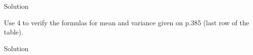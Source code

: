 \documentclass{article}
\begin{document}
\begin{spacing}{1.1}
\begin{homeworkProblem}
\begin{homeworkSection}{Solution}
  \end{homeworkSection}
\end{homeworkProblem}
\newpage
\begin{homeworkProblem}
  Use 4 to verify the formulas for mean and variance given on p.385 
  (last row of the table).
  \begin{homeworkSection}{Solution}
    
  \end{homeworkSection}
\end{homeworkProblem}
  
\end{spacing}
\end{document}
